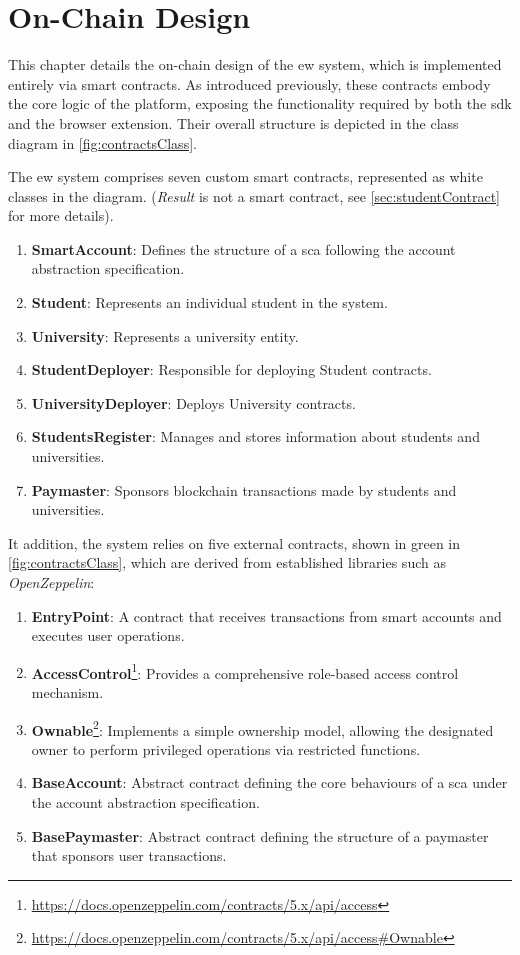 \chapter{On-Chain Design}
\label{chap:onchainDesign}
This chapter details the on-chain design of the \gls{ew} system, which is implemented entirely via smart contracts. As introduced previously, these contracts embody the core logic of the platform, exposing the functionality required by both the \gls{sdk} and the browser extension. Their overall structure is depicted in the class diagram in \cref{fig:contractsClass}. 

The \gls{ew} system comprises seven custom smart contracts, represented as white classes in the diagram. (\textit{Result} is not a smart contract, see \cref{sec:studentContract} for more details). 
\begin{enumerate}
    \item \textbf{SmartAccount}: Defines the structure of a \gls{sca} following the account abstraction specification.
    \item \textbf{Student}: Represents an individual student in the system.
    \item \textbf{University}: Represents a university entity.
    \item \textbf{StudentDeployer}: Responsible for deploying Student contracts.
    \item \textbf{UniversityDeployer}: Deploys University contracts.
    \item \textbf{StudentsRegister}: Manages and stores information about students and universities.
    \item \textbf{Paymaster}: Sponsors blockchain transactions made by students and universities.
\end{enumerate}
It addition, the system relies on five external contracts, shown in green in \cref{fig:contractsClass}, which are derived from established libraries such as \textit{OpenZeppelin}:
\begin{enumerate}
    \item \textbf{EntryPoint}: A contract that receives transactions from smart accounts and executes user operations.
    \item \textbf{AccessControl}\footnote{\url{https://docs.openzeppelin.com/contracts/5.x/api/access}}: Provides a comprehensive role-based access control mechanism.
    \item \textbf{Ownable}\footnote{\url{https://docs.openzeppelin.com/contracts/5.x/api/access\#Ownable}}: Implements a simple ownership model, allowing the designated owner to perform privileged operations via restricted functions.
    \item \textbf{BaseAccount}: Abstract contract defining the core behaviours of a \gls{sca} under the account abstraction specification.
    \item \textbf{BasePaymaster}: Abstract contract defining the structure of a paymaster that sponsors user transactions.
\end{enumerate}

